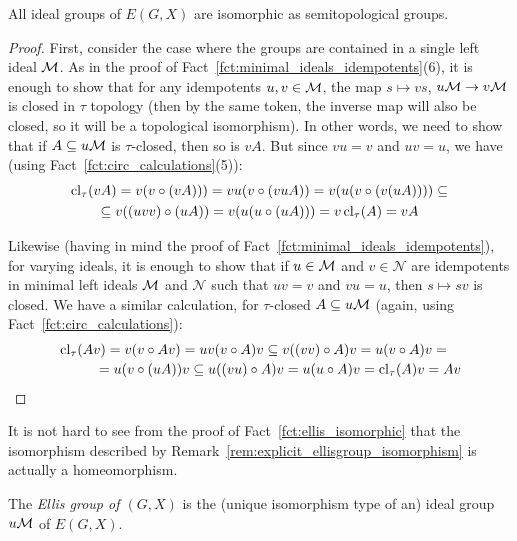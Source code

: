 	\begin{fct}
		\label{fct:ellis_isomorphic}
		All ideal groups of $E(G,X)$ are isomorphic as semitopological groups.
	\end{fct}
	\begin{proof}
		First, consider the case where the groups are contained in a single left ideal ${\mathcal M}$. As in the proof of Fact~\ref{fct:minimal_ideals_idempotents}(6), it is enough to show that for any idempotents $u,v\in {\mathcal M}$, the map $s\mapsto vs$, $u{\mathcal M}\to v{\mathcal M}$ is closed in $\tau$ topology (then by the same token, the inverse map will also be closed, so it will be a topological isomorphism). In other words, we need to show that if $A\subseteq u{\mathcal M}$ is $\tau$-closed, then so is $vA$. But since $vu=v$ and $uv=u$, we have (using Fact~\ref{fct:circ_calculations}(5)):
		\begin{multline*}
			\operatorname{{cl}}_{\tau}(vA)=v(v\circ(vA)))=vu(v\circ (vuA))=v(u(v\circ (v(uA))))\subseteq\\\subseteq v((uvv)\circ (uA))=v(u(u\circ(uA)))=v\operatorname{{cl}}_{\tau}(A)=vA
		\end{multline*}
		
		Likewise (having in mind the proof of Fact~\ref{fct:minimal_ideals_idempotents}), for varying ideals, it is enough to show that if $u\in {\mathcal M}$ and $v\in \mathcal N$ are idempotents in minimal left ideals ${\mathcal M}$ and $\mathcal N$ such that $uv=v$ and $vu=u$, then $s\mapsto sv$ is closed. We have a similar calculation, for $\tau$-closed $A\subseteq u{\mathcal M}$ (again, using Fact~\ref{fct:circ_calculations}):
		\begin{equation*}
			\begin{multlined}
				\cl_{\tau}(Av)=v(v\circ Av)=uv(v\circ A)v\subseteq  v((vv)\circ A)v = u(v\circ A)v=\\=u(v\circ (uA))v\subseteq u((vu)\circ A)v=u(u\circ A)v=\cl_{\tau}(A)v=Av
			\end{multlined}\qedhere
		\end{equation*}
	\end{proof}
	
	\begin{rem}
		\label{rem:explicit_ellisgroup_isomorphism_2}
		It is not hard to see from the proof of Fact~\ref{fct:ellis_isomorphic} that the isomorphism described by Remark~\ref{rem:explicit_ellisgroup_isomorphism} is actually a homeomorphism.\xqed{\lozenge}
	\end{rem}
	
	\begin{dfn}
		\label{dfn:ellis_group}
		The \emph{Ellis group of $(G,X)$} is the (unique isomorphism type of an) ideal group $u{\mathcal M}$ of $E(G,X)$.
		\xqed{\lozenge}
	\end{dfn}
	
